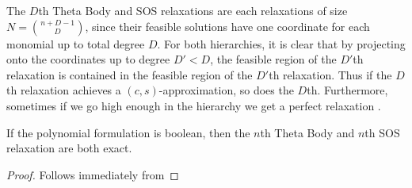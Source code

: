 The $D$th Theta Body and SOS relaxations are each relaxations of size $N = \binom{n+D-1}{D}$, since their feasible solutions have one coordinate for each monomial up to total degree $D$. For both hierarchies, it is clear that by projecting onto the coordinates up to degree $D' < D$, the feasible region of the $D'$th relaxation is contained in the feasible region of the $D'$th relaxation. Thus if the $D$th relaxation achieves a $(c,s)$-approximation, so does the $D$th. Furthermore, sometimes if we go high enough in the hierarchy we get a perfect relaxation .
\begin{lemma}
If the polynomial formulation is boolean, then the $n$th Theta Body and $n$th SOS relaxation are both exact.
\end{lemma}
\begin{proof}
Follows immediately from 
\end{proof}


